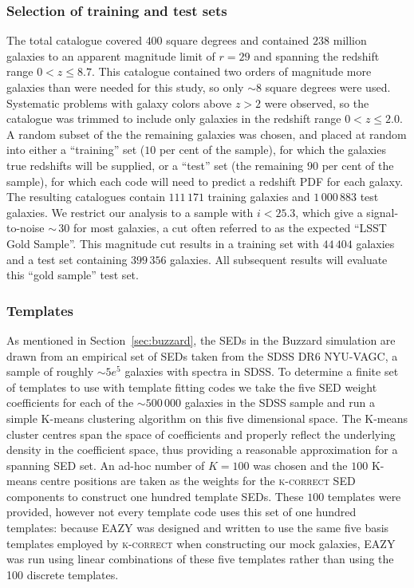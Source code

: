 \documentclass[usenatbib]{mn2e}
\newcommand{\red}[1]{\textcolor{red}{#1}}
\begin{document}
\subsubsection{Selection of training and test sets}
\label{sec:buzztraining}
The total catalogue covered $400$ square degrees and contained $238$ million galaxies to an apparent magnitude limit of $r\!=\!29$ and spanning the redshift range $0\!<\!z\!\leq\!8.7$. This catalogue contained two orders of magnitude more galaxies than were needed for this study, so only $\sim\!8$ square degrees were used. Systematic problems with galaxy colors above $z\!>\!2$ were observed, so the catalogue was trimmed to include only galaxies in the redshift range $0\!<\!z\!\leq\!2.0$. A random subset of the the remaining galaxies was chosen, and placed at random into either a ``training'' set ($10$ per cent of the sample), for which the galaxies true redshifts will be supplied, or a ``test'' set (the remaining $90$ per cent of the sample), for which each code will need to predict a redshift PDF for each galaxy. The resulting catalogues contain $111\,171$ training galaxies and $1\,000\,883$ test galaxies.  We restrict our analysis to a sample with $i<25.3$, which give a signal-to-noise $\sim\,30$ for most galaxies, a cut often referred to as the expected ``LSST Gold Sample''.  This magnitude cut results in a training set with $44\,404$ galaxies and a test set containing $399\,356$ galaxies.  All subsequent results will evaluate this ``gold sample'' test set.

\subsubsection{Templates}
\label{sec:buzztemplates}
As mentioned in Section~\ref{sec:buzzard}, the SEDs in the Buzzard simulation are drawn from an empirical set of SEDs taken from the SDSS DR6 NYU-VAGC, a sample of roughly $\sim5e^{5}$ galaxies with spectra in SDSS. To determine a finite set of templates to use with template fitting codes we take the five SED weight coefficients for each of the $\sim 500\,000$ galaxies in the SDSS sample and run a simple K-means clustering algorithm on this five dimensional space. The K-means cluster centres span the space of coefficients and properly reflect the underlying density in the coefficient space, thus providing a reasonable approximation for a spanning SED set. An ad-hoc number of $K=100$ was chosen and the $100$ K-means centre positions are taken as the weights for the \textsc{k-correct} SED components to construct one hundred template SEDs. These $100$ templates were provided, 
however not every template code uses this set of one hundred templates: because EAZY was designed and written to use the same five basis templates employed by \textsc{k-correct} when constructing our mock galaxies, EAZY was run using linear combinations of these five templates rather than using the 100 discrete templates.
\end{document}
